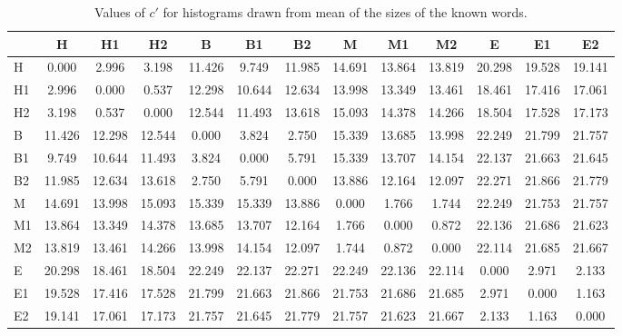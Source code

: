 \begin{table*}[h!]
\begin{center}
\begin{tabular}{| l | c | c | c | c | c | c | c | c | c | c | c | c |}\hline
 & H & H1 & H2 & B & B1 & B2 & M & M1 & M2 & E & E1 & E2 \\\hline
H & 0.000  & 2.996  & 3.198  & 11.426  & 9.749  & 11.985  & 14.691  & 13.864  & 13.819  & 20.298  & 19.528  & 19.141 \\\hline
H1 & 2.996  & 0.000  & 0.537  & 12.298  & 10.644  & 12.634  & 13.998  & 13.349  & 13.461  & 18.461  & 17.416  & 17.061 \\\hline
H2 & 3.198  & 0.537  & 0.000  & 12.544  & 11.493  & 13.618  & 15.093  & 14.378  & 14.266  & 18.504  & 17.528  & 17.173 \\\hline
B & 11.426  & 12.298  & 12.544  & 0.000  & 3.824  & 2.750  & 15.339  & 13.685  & 13.998  & 22.249  & 21.799  & 21.757 \\\hline
B1 & 9.749  & 10.644  & 11.493  & 3.824  & 0.000  & 5.791  & 15.339  & 13.707  & 14.154  & 22.137  & 21.663  & 21.645 \\\hline
B2 & 11.985  & 12.634  & 13.618  & 2.750  & 5.791  & 0.000  & 13.886  & 12.164  & 12.097  & 22.271  & 21.866  & 21.779 \\\hline
M & 14.691  & 13.998  & 15.093  & 15.339  & 15.339  & 13.886  & 0.000  & 1.766  & 1.744  & 22.249  & 21.753  & 21.757 \\\hline
M1 & 13.864  & 13.349  & 14.378  & 13.685  & 13.707  & 12.164  & 1.766  & 0.000  & 0.872  & 22.136  & 21.686  & 21.623 \\\hline
M2 & 13.819  & 13.461  & 14.266  & 13.998  & 14.154  & 12.097  & 1.744  & 0.872  & 0.000  & 22.114  & 21.685  & 21.667 \\\hline
E & 20.298  & 18.461  & 18.504  & 22.249  & 22.137  & 22.271  & 22.249  & 22.136  & 22.114  & 0.000  & 2.971  & 2.133 \\\hline
E1 & 19.528  & 17.416  & 17.528  & 21.799  & 21.663  & 21.866  & 21.753  & 21.686  & 21.685  & 2.971  & 0.000  & 1.163 \\\hline
E2 & 19.141  & 17.061  & 17.173  & 21.757  & 21.645  & 21.779  & 21.757  & 21.623  & 21.667  & 2.133  & 1.163  & 0.000 \\\hline
\end{tabular}
\caption{Values of $c'$ for histograms drawn from mean of the sizes of the known words.}
\end{center}
\end{table*}